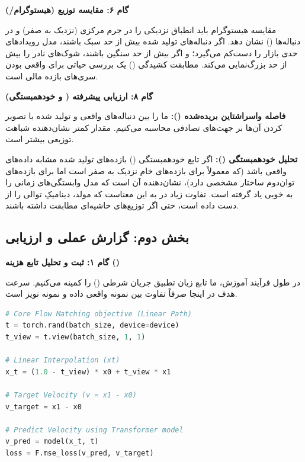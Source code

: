 \textbf{گام ۶: مقایسه توزیع (هیستوگرام/)}
\begin{solutionbox}
    مقایسه هیستوگرام باید انطباق نزدیکی را در جرم مرکزی (نزدیک به صفر) و در دنباله‌ها () نشان دهد. اگر دنباله‌های تولید شده بیش از حد سبک باشند، مدل رویدادهای حدی بازار را دست‌کم می‌گیرد؛ و اگر بیش از حد سنگین باشند، شوک‌های نادر را بیش از حد بزرگ‌نمایی می‌کند. مطابقت کشیدگی () یک بررسی حیاتی برای واقعی بودن سری‌های بازده مالی است.

    
\end{solutionbox}

\textbf{گام ۸: ارزیابی پیشرفته ( و خودهمبستگی)}
\begin{solutionbox}
    \textbf{فاصله واسراشتاین بریده‌شده ():} ما  را بین دنباله‌های واقعی و تولید شده با تصویر کردن آن‌ها بر جهت‌های تصادفی محاسبه می‌کنیم. مقدار کمتر نشان‌دهنده شباهت توزیعی بیشتر است.
    
    \textbf{تحلیل خودهمبستگی ():}
    اگر تابع خودهمبستگی () بازده‌های تولید شده مشابه داده‌های واقعی باشد (که معمولاً برای بازده‌های خام نزدیک به صفر است اما برای بازده‌های توان‌دوم ساختار مشخصی دارد)، نشان‌دهنده آن است که مدل وابستگی‌های زمانی را به خوبی یاد گرفته است. تفاوت زیاد در  به این معناست که مولد، دینامیکِ توالی را از دست داده است، حتی اگر توزیع‌های حاشیه‌ای مطابقت داشته باشند.

    
\end{solutionbox}


\newpage
\subsection{بخش دوم: گزارش عملی و ارزیابی}

\textbf{گام ۱: ثبت و تحلیل تابع هزینه ()}
\begin{solutionbox}
    در طول فرآیند آموزش، ما تابع زیان تطبیق جریان شرطی () را کمینه می‌کنیم. سرعت هدف در اینجا صرفاً تفاوت بین نمونه واقعی داده و نمونه نویز است.

\begin{latin}
\begin{lstlisting}[language=Python]
# Core Flow Matching objective (Linear Path)
t = torch.rand(batch_size, device=device)
t_view = t.view(batch_size, 1, 1)

# Linear Interpolation (xt)
x_t = (1.0 - t_view) * x0 + t_view * x1

# Target Velocity (v = x1 - x0)
v_target = x1 - x0

# Predict Velocity using Transformer model
v_pred = model(x_t, t)
loss = F.mse_loss(v_pred, v_target)
\end{lstlisting}
\end{latin}
\end{solutionbox}

